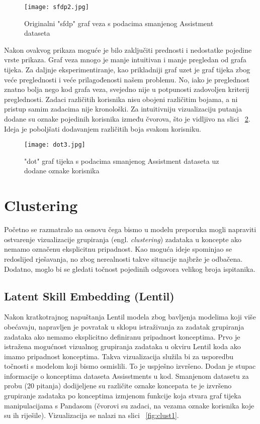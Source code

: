 \begin{figure}[H]
\centering
\texttt{[image: sfdp2.jpg]}
\caption{Originalni "sfdp" graf veza s podacima smanjenog Assistment dataseta}
\label{fig:sfdp2}
\end{figure}

\noindent Nakon ovakvog prikaza moguće je bilo zaključiti prednosti i nedostatke pojedine vrste prikaza.\newline
Graf veza mnogo je manje intuitivan i manje pregledan od grafa tijeka. Za daljnje eksperimentiranje, kao prikladniji graf uzet je graf tijeka zbog veće preglednosti i veće prilagođenosti našem problemu. No, iako je preglednost znatno bolja nego kod grafa veza, svejedno nije u potpunosti zadovoljen kriterij preglednosti. Zadaci različitih korisnika nisu obojeni različitim bojama, a ni pristup samim zadacima nije kronološki.\newline
Za intuitivniju vizualizaciju putanja dodane su oznake pojedinih korisnika između čvorova, što je vidljivo na slici ~\ref{fig:dot3}. Ideja je poboljšati dodavanjem različitih boja svakom korisniku. 

\begin{figure}[!htb]
\centering
\texttt{[image: dot3.jpg]}
\caption{"dot" graf tijeka s podacima smanjenog Assistment dataseta uz dodane oznake korisnika}
\label{fig:dot3}
\end{figure}

\chapter{Clustering}
Početno se razmatralo na osnovu čega bismo u modelu preporuka mogli napraviti ostvarenje vizualizacije grupiranja (engl. \textit{clustering}) zadataka u koncepte ako nemamo označenu eksplicitnu pripadnost. Kao moguća ideje spominjao se redoslijed rješavanja, no zbog nerealnosti takve situacije najbrže je odbačena. Dodatno, moglo bi se gledati točnost pojedinih odgovora velikog broja ispitanika.

\section{Latent Skill Embedding (Lentil)}

\noindent Nakon kratkotrajnog napuštanja Lentil modela zbog bavljenja modelima koji više obećavaju, napravljen je povratak u sklopu istraživanja za zadatak grupiranja zadataka ako nemamo eksplicitno definiranu pripadnost konceptima.\newline
Prvo je istražena mogućnost vizualnog grupiranja zadataka u okviru Lentil koda ako imamo pripadnost konceptima. Takva vizualizacija služila bi za usporedbu točnosti s modelom koji bismo osmislili. To je uspješno izvršeno. Dodan je stupac informacije o konceptima dataseta Assisstments u kod. Smanjenom datasetu za probu (20 pitanja) dodijeljene su različite oznake koncepata te je izvršeno grupiranje zadataka po konceptima izmjenom funkcije koja stvara graf tijeka manipulacijama s Pandasom (čvorovi su zadaci, na vezama oznake korisnika koje su ih riješile). Vizualizacija se nalazi na slici ~\ref{fig:clust1}.

